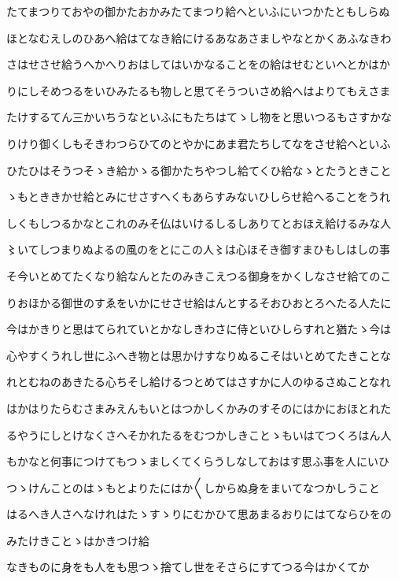 \documentclass[a4paper,11pt,landscape]{ltjtarticle}
\begin{document}
たてまつりておやの御かたおかみたてまつり給へといふにいつかたともしらぬ
\par\medskip
ほとなむえしのひあへ給はてなき給にけるあなあさましやなとかくあふなきわ
\par\medskip
さはせさせ給うへかへりおはしてはいかなることをの給はせむといへとかはか
\par\medskip
りにしそめつるをいひみたるも物しと思てそうついさめ給へはよりてもえさま
\par\medskip
たけするてん三かいちうなといふにもたちはてゝし物をと思いつるもさすかな
\par\medskip
りけり御くしもそきわつらひてのとやかにあま君たちしてなをさせ給へといふ
\par\medskip
ひたひはそうつそゝき給かゝる御かたちやつし給てくひ給なゝとたうときこと
\par\medskip
ゝもとききかせ給とみにせさすへくもあらすみないひしらせ給へることをうれ
\par\medskip
しくもしつるかなとこれのみそ仏はいけるしるしありてとおほえ給けるみな人
\par\medskip
〻いてしつまりぬよるの風のをとにこの人〻は心ほそき御すまひもしはしの事
\par\medskip
そ今いとめてたくなり給なんとたのみきこえつる御身をかくしなさせ給てのこ
\par\medskip
りおほかる御世のすゑをいかにせさせ給はんとするそおひおとろへたる人たに
\par\medskip
今はかきりと思はてられていとかなしきわさに侍といひしらすれと猶たゝ今は
\par\medskip
心やすくうれし世にふへき物とは思かけすなりぬるこそはいとめてたきことな
\par\medskip
れとむねのあきたる心ちそし給けるつとめてはさすかに人のゆるさぬことなれ
\par\medskip
はかはりたらむさまみえんもいとはつかしくかみのすそのにはかにおほとれた
\par\medskip
るやうにしとけなくさへそかれたるをむつかしきことゝもいはてつくろはん人
\par\medskip
もかなと何事につけてもつゝましくてくらうしなしておはす思ふ事を人にいひ
\par\medskip
つゝけんことのはゝもとよりたにはか〱しからぬ身をまいてなつかしうこと
\par\medskip
はるへき人さへなけれはたゝすゝりにむかひて思あまるおりにはてならひをの
\par\medskip
みたけきことゝはかきつけ給
\par\medskip
なきものに身をも人をも思つゝ捨てし世をそさらにすてつる今はかくてか
\end{document}
